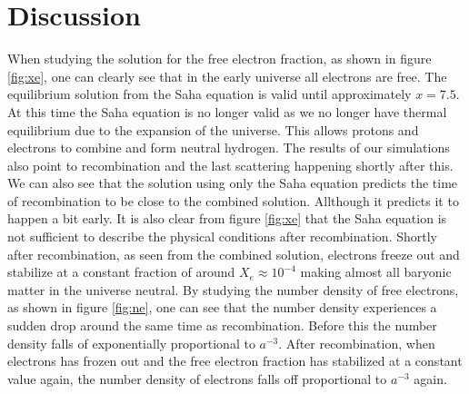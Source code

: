 \documentclass[onecolumn]{aastex62}
\begin{document}
\section{Discussion}\label{sec:discussion}
When studying the solution for the free electron fraction, as shown in figure \ref{fig:xe}, one can clearly see that in the early universe all electrons are free. The equilibrium solution from the Saha equation is valid until approximately $x=7.5$. At this time the Saha equation is no longer valid as we no longer have thermal equilibrium due to the expansion of the universe. This allows protons and electrons to combine and form neutral hydrogen. The results of our simulations also point to recombination and the last scattering happening shortly after this. We can also see that the solution using only the Saha equation predicts the time of recombination to be close to the combined solution. Allthough it predicts it to happen a bit early. It is also clear from figure \ref{fig:xe} that the Saha equation is not sufficient to describe the physical conditions after recombination. Shortly after recombination, as seen from the combined solution, electrons freeze out and stabilize at a constant fraction of around $X_e\approx10^{-4}$ making almost all baryonic matter in the universe neutral. By studying the number density of free electrons, as shown in figure \ref{fig:ne}, one can see that the number density experiences a sudden drop around the same time as recombination. Before this the number density falls of exponentially proportional to $a^{-3}$. After recombination, when electrons has frozen out and the free electron fraction has stabilized at a constant value again, the number density of electrons falls off proportional to $a^{-3}$ again.\\\\\indent
\end{document}
